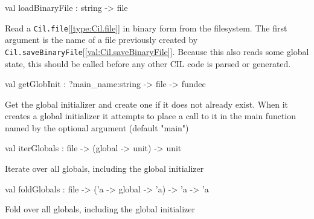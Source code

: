 \documentclass[11pt]{article}
\begin{document}
\label{val:Cil.loadBinaryFile}\begin{ocamldoccode}
val loadBinaryFile : string -> file
\end{ocamldoccode}
\begin{ocamldocdescription}
Read a {\tt{Cil.file}}[\ref{type:Cil.file}] in binary form from the filesystem. The first
 argument is the name of a file previously created by
 {\tt{Cil.saveBinaryFile}}[\ref{val:Cil.saveBinaryFile}]. Because this also reads some global state,
 this should be called before any other CIL code is parsed or generated.


\end{ocamldocdescription}




\label{val:Cil.getGlobInit}\begin{ocamldoccode}
val getGlobInit : ?main_name:string -> file -> fundec
\end{ocamldoccode}
\begin{ocamldocdescription}
Get the global initializer and create one if it does not already exist. 
 When it creates a global initializer it attempts to place a call to it in 
 the main function named by the optional argument (default "main")


\end{ocamldocdescription}




\label{val:Cil.iterGlobals}\begin{ocamldoccode}
val iterGlobals : file -> (global -> unit) -> unit
\end{ocamldoccode}
\begin{ocamldocdescription}
Iterate over all globals, including the global initializer


\end{ocamldocdescription}




\label{val:Cil.foldGlobals}\begin{ocamldoccode}
val foldGlobals : file -> ('a -> global -> 'a) -> 'a -> 'a
\end{ocamldoccode}
\begin{ocamldocdescription}
Fold over all globals, including the global initializer


\end{ocamldocdescription}
\end{document}
